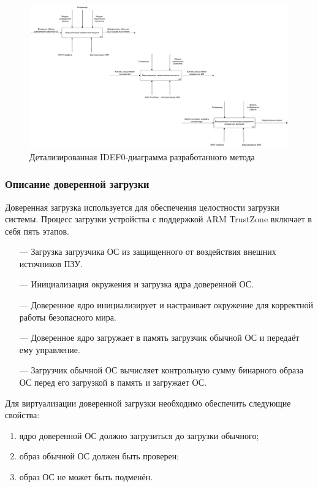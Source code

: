 \begin{figure}[h]
	\centering
	\includegraphics[width=\textwidth]{img/main-idef0-2.pdf}
	\caption{Детализированная IDEF0-диаграмма разработанного метода}
	\label{fig:idef0-main-2}
\end{figure}

\subsubsection{Описание доверенной загрузки}

Доверенная загрузка используется для обеспечения целостности загрузки системы. Процесс загрузки устройства с поддержкой ARM TrustZone включает в себя пять этапов.

\begin{itemize}
	\item [---] Загрузка загрузчика ОС из защищенного от воздействия внешних источников ПЗУ.
	\item [---] Инициализация окружения и загрузка ядра доверенной ОС.
	\item [---] Доверенное ядро инициализирует и настраивает окружение для корректной работы безопасного мира.
	\item [---] Доверенное ядро загружает в память загрузчик обычной ОС и передаёт ему управление.
	\item [---] Загрузчик обычной ОС вычисляет контрольную сумму бинарного образа ОС перед его загрузкой в память и загружает ОС.
\end{itemize}

Для виртуализации доверенной загрузки необходимо обеспечить следующие свойства:

\begin{enumerate}
	\item ядро доверенной ОС должно загрузиться до загрузки обычного;
	\item образ обычной ОС должен быть проверен;
	\item образ ОС не может быть подменён.
\end{enumerate}

